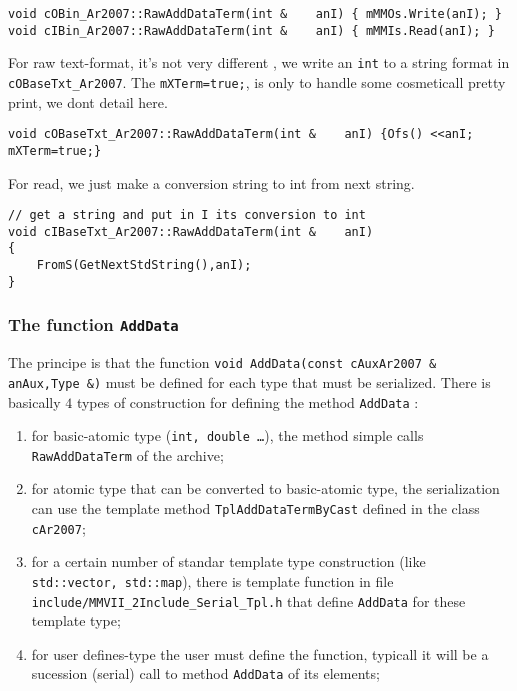 \begin{verbatim}
void cOBin_Ar2007::RawAddDataTerm(int &    anI) { mMMOs.Write(anI); }
void cIBin_Ar2007::RawAddDataTerm(int &    anI) { mMMIs.Read(anI); }
\end{verbatim}

For raw text-format, it's not very different ,  we write an {\tt int} to a string format in {\tt cOBaseTxt\_Ar2007}.
The {\tt mXTerm=true;}, is only to handle some cosmeticall pretty print, we dont detail here.

\begin{verbatim}
void cOBaseTxt_Ar2007::RawAddDataTerm(int &    anI) {Ofs() <<anI; mXTerm=true;}
\end{verbatim}

For read, we just make a conversion string to int from next string.

\begin{verbatim}
// get a string and put in I its conversion to int
void cIBaseTxt_Ar2007::RawAddDataTerm(int &    anI)
{
    FromS(GetNextStdString(),anI);
}
\end{verbatim}



\subsubsection{The function {\tt AddData}}

The principe is that the function {\tt void AddData(const  cAuxAr2007 \& anAux,Type \&)} must be defined
for each type that must be serialized.  There is basically $4$ types of
construction for defining the method {\tt AddData} :

\begin{enumerate}
	\item for basic-atomic type  ({\tt int, double \dots}), the method
		simple calls {\tt RawAddDataTerm} of the archive;

	\item for atomic type that can be converted to basic-atomic type, 
		the serialization can use the template method {\tt TplAddDataTermByCast}
		defined in the class {\tt cAr2007};

	\item for a certain number of standar template type construction (like {\tt std::vector, std::map}),
		there is template function in file {\tt include/MMVII\_2Include\_Serial\_Tpl.h} that define
		{\tt AddData} for these template type;  

	\item for user defines-type the user must define the function, typicall it will be a 
		sucession (serial) call to method {\tt AddData} of its elements;
\end{enumerate}

